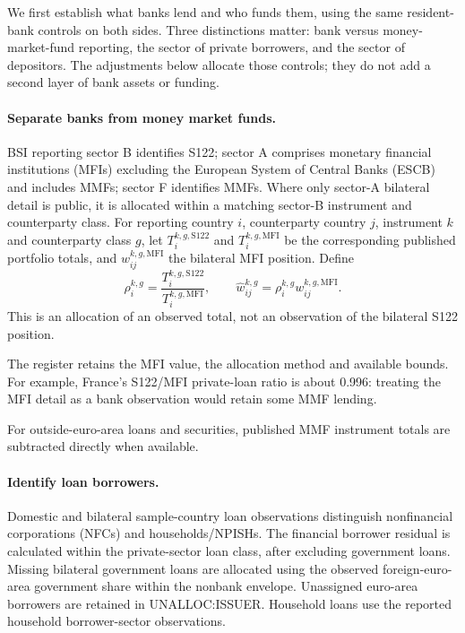 We first establish what banks lend and who funds them, using the same resident-bank controls on both sides. Three distinctions matter: bank versus money-market-fund reporting, the sector of private borrowers, and the sector of depositors. The adjustments below allocate those controls; they do not add a second layer of bank assets or funding.

\paragraph{Separate banks from money market funds.}
BSI reporting sector B identifies S122; sector A comprises monetary financial institutions (MFIs) excluding the European System of Central Banks (ESCB) and includes MMFs; sector F identifies MMFs. Where only sector-A bilateral detail is public, it is allocated within a matching sector-B instrument and counterparty class. For reporting country $i$, counterparty country $j$, instrument $k$ and counterparty class $g$, let $T_i^{k,g,\mathrm{S122}}$ and $T_i^{k,g,\mathrm{MFI}}$ be the corresponding published portfolio totals, and $w_{ij}^{k,g,\mathrm{MFI}}$ the bilateral MFI position. Define
\begin{equation}
 \rho_i^{k,g}=\frac{T_i^{k,g,\mathrm{S122}}}{T_i^{k,g,\mathrm{MFI}}},
 \qquad \widehat w_{ij}^{k,g}=\rho_i^{k,g}w_{ij}^{k,g,\mathrm{MFI}}.
 \label{eq:mmf-separation}
\end{equation}
This is an allocation of an observed total, not an observation of the bilateral S122 position. 

The register retains the MFI value, the allocation method and available bounds. For example, France's S122/MFI private-loan ratio is about 0.996: treating the MFI detail as a bank observation would retain some MMF lending. 

For outside-euro-area loans and securities, published MMF instrument totals are subtracted directly when available.

\paragraph{Identify loan borrowers.}
Domestic and bilateral sample-country loan observations distinguish nonfinancial corporations (NFCs) and households/NPISHs. The financial borrower residual is calculated within the private-sector loan class, after excluding government loans. Missing bilateral government loans are allocated using the observed foreign-euro-area government share within the nonbank envelope. Unassigned euro-area borrowers are retained in UNALLOC:ISSUER. Household loans use the reported household borrower-sector observations.

